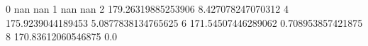 0 nan nan
1 nan nan
2 179.26319885253906 8.427078247070312
4 175.9239044189453 5.0877838134765625
6 171.54507446289062 0.708953857421875
8 170.83612060546875 0.0
